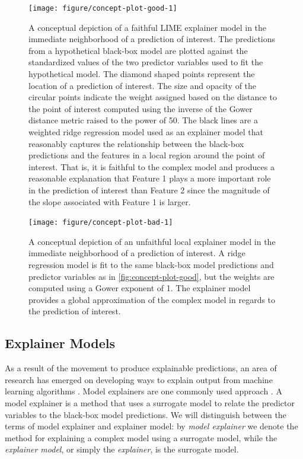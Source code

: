 \documentclass[AMS,STIX2COL]{WileyNJD-v2}\usepackage[]{graphicx}\usepackage[]{color}
\newenvironment{knitrout}{}{} %
\begin{document}
\begin{figure}[!htbp]
\begin{knitrout}
\color{fgcolor}
\texttt{[image: figure/concept-plot-good-1]} 

\end{knitrout}
\caption{A conceptual depiction of a faithful LIME explainer model in the immediate neighborhood of a prediction of interest. The predictions from a hypothetical black-box model are plotted against the standardized values of the two predictor variables used to fit the hypothetical model. The diamond shaped points represent the location of a prediction of interest. The size and opacity of the circular points indicate the weight assigned based on the distance to the point of interest computed using the inverse of the Gower distance metric raised to the power of 50. The black lines are a weighted ridge regression model used as an explainer model that reasonably captures the relationship between the black-box predictions and the features in a local region around the point of interest. That is, it is faithful to the complex model and produces a reasonable explanation that Feature 1 plays a more important role in the prediction of interest than Feature 2 since the magnitude of the slope associated with Feature 1 is larger.}
\label{fig:concept-plot-good}

\vspace*{\floatsep}
 
\begin{knitrout}
\color{fgcolor}
\texttt{[image: figure/concept-plot-bad-1]} 

\end{knitrout}
\caption{A conceptual depiction of an unfaithful local explainer model in the immediate neighborhood of a prediction of interest. A ridge regression model is fit to the same black-box model predictions and predictor variables as in \autoref{fig:concept-plot-good}, but the weights are computed using a Gower exponent of 1. The explainer model provides a global approximation of the complex model in regards to the prediction of interest.}
\label{fig:concept-plot-bad}
\end{figure}

\subsection{Explainer Models}

As a result of the movement to produce explainable predictions, an area of research has emerged on developing ways to explain output from machine learning algorithms \citep{guidotti:2018} \citep{mohseni:2018} \citep{molnar:2019}. Model explainers are one commonly used approach \citep{mohseni:2018}. A model explainer is a method that uses a surrogate model to relate the predictor variables to the black-box model predictions. We will distinguish between the terms of model explainer and explainer model: by \emph{model explainer} we denote the  method for explaining a complex model using a surrogate model, while the \emph{explainer model}, or simply the \emph{explainer}, is the surrogate model.
\end{document}
